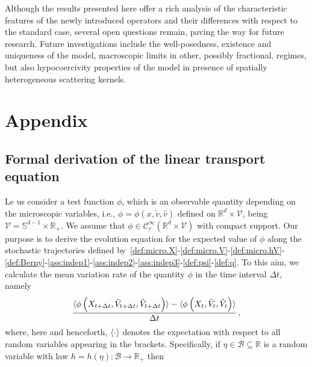 \documentclass[a4paper]{article}
\theoremstyle{Theorem}\newtheorem{proposition}{Proposition}[section]
\theoremstyle{Remark}\newtheorem{remark}{Remark}[section]
\theoremstyle{Theorem}\newtheorem{theorem}{Theorem}[section]
\DeclarePairedDelimiter\ave{\langle}{\rangle}
\newcommand{\R}{\mathbb{R}}
\newcommand{\hv}{\hat{v}}
\newcommand{\tv}{\tilde{v}}
\newcommand{\hV}{\hat{V}}
\newcommand{\tV}{\tilde{V}}
\begin{document}
Although the results presented here offer a rich analysis of the characteristic features of the newly introduced operators and their differences with respect to the standard case, several open questions remain, paving the way for future research. Future investigations include the well-posedness, existence and uniqueness of the model, macroscopic limits in other, possibly fractional, regimes, but also hypocoercivity properties of the model in presence of spatially heterogeneous scattering kernels. %






\appendix
\section{Appendix} 
\subsection{Formal derivation of the linear transport equation}\label{appendix1}
Le us consider a test function $\phi$, which is an observable quantity depending on the microscopic variables, i.e., $\phi=\phi(x,\tv,\hv)$ defined on $\R^d\times \mathcal{V}$, being $\mathcal{V}= \mathbb{S}^{d-1}\times \R_+$. We assume that ${\phi \in \mathcal{C}_c^{\infty}(\R^d\times \mathcal{V})}$ with compact support. Our purpose is to derive the evolution equation for the expected value of $\phi$ along the stochastic trajectories defined by~\eqref{def:micro.X}-\eqref{def:micro.V}-\eqref{def:micro.hV}-\eqref{def:Berny}-\eqref{ass:indep1}-\eqref{ass:indep2}-\eqref{ass:indep3}-\eqref{def:psi}-\eqref{def:q}. To this aim, we calculate the mean variation rate of the quantity $\phi$ in the time interval $\Delta{t}$, namely
\begin{equation*}\label{def:incr.ratio}
\frac{\ave{\phi\left(X_{t+\Delta t},\tV_{t+\Delta t}, \hV_{t+\Delta t}\right)}-\ave{\phi\left(X_t,\tV_t,\hV_t\right)}}{\Delta{t}}\,,
\end{equation*}
where, here and henceforth, $\ave{\cdot}$ denotes the expectation with respect to all random variables appearing in the brackets. Specifically, if $\eta\in\mathcal{B}\subseteq\R$ is a random variable with law $h=h(\eta):\mathcal{B}\to\R_+$ then
\end{document}
